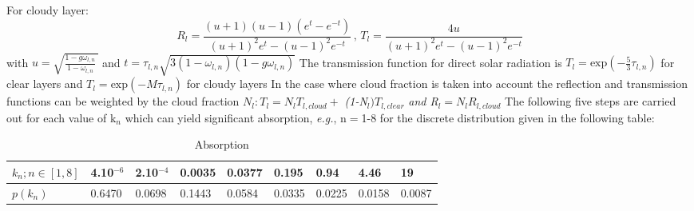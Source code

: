 For cloudy layer:
\begin{equation}
R_{l}=\frac{(u+1)(u-1)\left( e^{t}-e^{-t} \right)}{\left( u+1
\right)^{2}e^{t}-\left( u-1 \right)^{2}e^{-t}}\, ,\, T_{l}=\frac{4u}{\left(
u+1 \right)^{2}e^{t}-\left( u-1 \right)^{2}e^{-t}}
\end{equation}
with
\newline
\newline
$u=\sqrt {\frac{1-g\omega_{l,n}}{1-\omega_{l,n}}\, } $ and $t=\tau
_{l,n}\sqrt {3(1-\omega_{l,n})(1-g\omega_{l,n})} $
\newline
The transmission function for direct solar radiation is
\newline
\newline
$T_{l}=\mathrm{exp}(-\frac{5}{3}\tau_{l,n})$ for clear layers and
\newline
$T_{l}=\mathrm{exp}(-M\tau_{l,n})$ for cloudy layers
\newline
\newline
In the case where cloud fraction is taken into account the reflection and
transmission functions can be weighted by the cloud fraction
\newline
\newline
 $N_{l} : T_{l}=N_{l} T_{l,cloud}+$\textit{ (1-N}$_{l})T_{l,clear}$\textit{ and R}$_{l}=N_{l}R_{l,cloud}$
\newline
\newline
The following five steps are carried out for each value of k$_{n}$ which can
yield significant absorption, \emph{e.g.}, n$=$1-8 for the discrete distribution
given in the following table:

\begin{table}[htbp]
\begin{center}
\caption[absorption]{Absorption}
\begin{tabular}{|p{76pt}|l|l|l|l|l|l|l|l|}

\hline

\hline

$k_{n};n\in \left[ 1,8 \right]$&
4.10$^{-6}$&
2.10$^{-4}$&
0.0035&
0.0377&
0.195&
0.94&
4.46&
19 \\
\hline
$p\left( k_{n} \right)$&
0.6470&
0.0698&
0.1443&
0.0584&
0.0335&
0.0225&
0.0158&
0.0087\\
\hline

\end{tabular}
\label{tab2}
\end{center}
\end{table}


